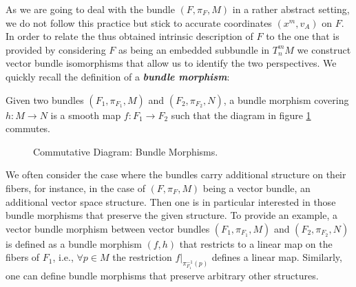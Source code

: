 As we are going to deal with the bundle $(F, \pi_F, M)$ in a rather abstract setting, we do not follow this practice but stick to accurate coordinates $(x^m,v_A)$ on $F$. 
In order to relate the thus obtained intrinsic description of $F$ to the one that is provided by considering $F$ as being an embedded subbundle in $T^m_n M$ we construct vector bundle isomorphisms that allow us to identify the two perspectives. We quickly recall the definition of a \textit{\textbf{bundle morphism}}:
\begin{definition}
Given two bundles $(F_1, \pi_{F_1}, M)$ and $(F_2, \pi_{F_2}, N)$, a bundle morphism covering $h : M \rightarrow N$ is a smooth map $f : F_1 \rightarrow F_2$ such that the diagram in figure \ref{BundleMorph} commutes.
\begin{figure}[hbt!]
\centering 
{}
\caption{Commutative Diagram: Bundle Morphisms.}\label{BundleMorph}
\end{figure}
\end{definition}
\begin{comment}
\begin{remark}
We normally denote a bundle morphism $f$ that covers $h$ as pair $(f,h)$. For the special case $M=N$ and $h=\mathrm{id}_M$ we shorten the notation to simply $f$. Also we might refer to a bundle morphism by the total space function $f$ if $f$ and $h$ are related via some specified construction, i.e., if $f$ can be obtained uniquely once $h$ is given. 
\end{remark}
\end{comment}
We often consider the case where the bundles carry additional structure on their fibers, for instance, in the case of $(F, \pi_F, M)$ being a vector bundle, an additional vector space structure. Then one is in particular interested in those bundle morphisms that preserve the given structure. To provide an example, a vector bundle morphism between vector bundles $(F_1, \pi_{F_1}, M)$ and $(F_2, \pi_{F_2}, N)$ is defined as a bundle morphism $(f,h)$ that restricts to a linear map on the fibers of $F_1$, i.e., $\forall p \in M$ the restriction $f \vert_{\pi_{F_1}^{-1}(p)}$ defines a linear map.
Similarly, one can define bundle morphisms that preserve arbitrary other structures.


